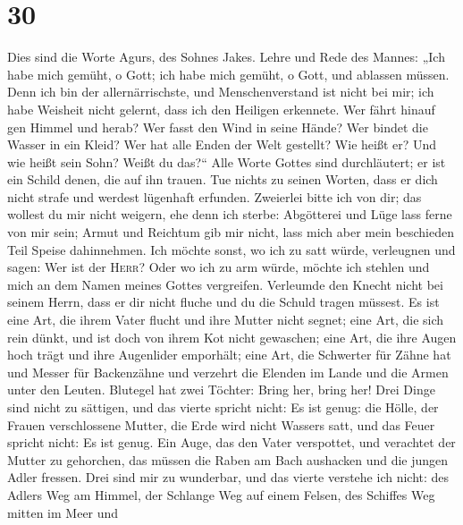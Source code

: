 \hypertarget{section-29}{%
\section{30}\label{section-29}}

 Dies sind die Worte Agurs, des Sohnes Jakes. Lehre und
Rede des Mannes: „Ich habe mich gemüht, o Gott; ich habe mich gemüht, o
Gott, und ablassen müssen.  Denn ich bin der
allernärrischste, und Menschenverstand ist nicht bei mir; 
ich habe Weisheit nicht gelernt, dass ich den Heiligen erkennete.
 Wer fährt hinauf gen Himmel und herab? Wer fasst den Wind
in seine Hände? Wer bindet die Wasser in ein Kleid? Wer hat alle Enden
der Welt gestellt? Wie heißt er? Und wie heißt sein Sohn? Weißt du
das?{}``  Alle Worte Gottes sind durchläutert; er ist ein
Schild denen, die auf ihn trauen.  Tue nichts zu seinen
Worten, dass er dich nicht strafe und werdest lügenhaft erfunden.
 Zweierlei bitte ich von dir; das wollest du mir nicht
weigern, ehe denn ich sterbe:  Abgötterei und Lüge lass
ferne von mir sein; Armut und Reichtum gib mir nicht, lass mich aber
mein beschieden Teil Speise dahinnehmen.  Ich möchte
sonst, wo ich zu satt würde, verleugnen und sagen: Wer ist der
\textsc{Herr}? Oder wo ich zu arm würde, möchte ich stehlen und mich an
dem Namen meines Gottes vergreifen.  Verleumde den Knecht
nicht bei seinem Herrn, dass er dir nicht fluche und du die Schuld
tragen müssest.  Es ist eine Art, die ihrem Vater flucht
und ihre Mutter nicht segnet;  eine Art, die sich rein
dünkt, und ist doch von ihrem Kot nicht gewaschen;  eine
Art, die ihre Augen hoch trägt und ihre Augenlider emporhält;
 eine Art, die Schwerter für Zähne hat und Messer für
Backenzähne und verzehrt die Elenden im Lande und die Armen unter den
Leuten.  Blutegel hat zwei Töchter: Bring her, bring her!
Drei Dinge sind nicht zu sättigen, und das vierte spricht nicht: Es ist
genug:  die Hölle, der Frauen verschlossene Mutter, die
Erde wird nicht Wassers satt, und das Feuer spricht nicht: Es ist genug.
 Ein Auge, das den Vater verspottet, und verachtet der
Mutter zu gehorchen, das müssen die Raben am Bach aushacken und die
jungen Adler fressen.  Drei sind mir zu wunderbar, und
das vierte verstehe ich nicht:  des Adlers Weg am Himmel,
der Schlange Weg auf einem Felsen, des Schiffes Weg mitten im Meer und
